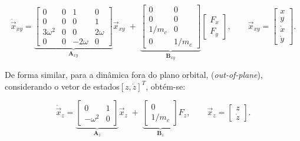 \begin{equation}
\label{eq:state_space_xy}
\dot{\vec x}_{xy} =
\underbrace{\begin{bmatrix}
0 & 0 & 1 & 0\\
0 & 0 & 0 & 1\\
3\omega^2 & 0 & 0 & 2\omega\\
0 & 0 & -2\omega & 0
\end{bmatrix}}_{\mathbf A_{xy}}
\vec x_{xy} \;+\;
\underbrace{\begin{bmatrix}
0 & 0\\
0 & 0\\
1/m_c & 0\\
0 & 1/m_c
\end{bmatrix}}_{\mathbf B_{xy}}
\begin{bmatrix} F_x \\ F_y \end{bmatrix},
\qquad
\vec x_{xy}=\begin{bmatrix} x \\ y \\ \dot x \\ \dot y \end{bmatrix}.
\end{equation}

De forma similar, para a dinâmica fora do plano orbital, (\textit{out-of-plane}), considerando o vetor de estados$[z,\dot{z}]^T$, obtém-se:


\begin{equation}
\label{eq:state_space_z}
\dot{\vec x}_z =
\underbrace{\begin{bmatrix}
0 & 1\\
-\omega^2 & 0
\end{bmatrix}}_{\mathbf A_z}
\vec x_z \;+\;
\underbrace{\begin{bmatrix}
0\\
1/m_c
\end{bmatrix}}_{\mathbf B_z} F_z,
\qquad
\vec x_z = \begin{bmatrix} z \\ \dot z \end{bmatrix}.
\end{equation}


